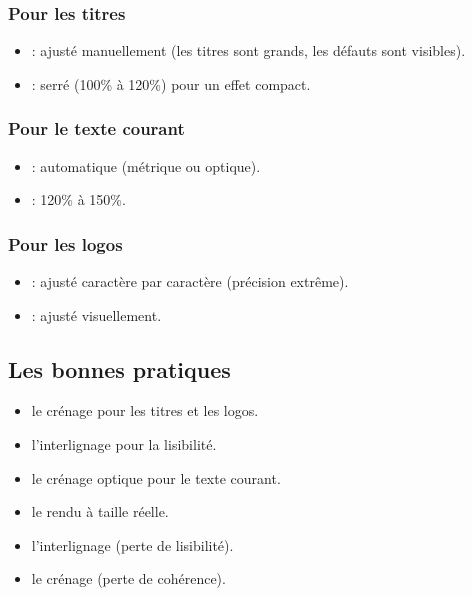 \subsubsection{Pour les titres}

\begin{itemize}
    \item {} : ajusté manuellement (les titres sont grands, les défauts sont visibles).
    \item {} : serré (100\% à 120\%) pour un effet compact.
\end{itemize}

\subsubsection{Pour le texte courant}

\begin{itemize}
    \item {} : automatique (métrique ou optique).
    \item {} : 120\% à 150\%.
\end{itemize}

\subsubsection{Pour les logos}

\begin{itemize}
    \item {} : ajusté caractère par caractère (précision extrême).
    \item {} : ajusté visuellement.
\end{itemize}

\subsection{Les bonnes pratiques}

\begin{itemize}
    \item {} le crénage pour les titres et les logos.
    \item {} l'interlignage pour la lisibilité.
    \item {} le crénage optique pour le texte courant.
    \item {} le rendu à taille réelle.
    \item {} l'interlignage (perte de lisibilité).
    \item {} le crénage (perte de cohérence).
\end{itemize}

